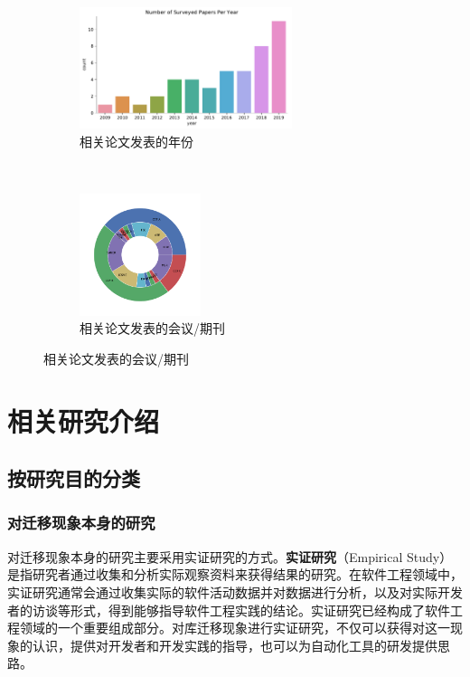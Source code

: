 \documentclass[UTF8]{ctexart}
\begin{document}
\begin{figure}[t!]
\centering
	\begin{subfigure}[t]{0.55\textwidth}
        \centering
        \includegraphics[height=1.4in]{fig/paper_year.pdf}
        \caption{相关论文发表的年份}
        \label{fig:paper-year} 
    \end{subfigure}
    ~
    \begin{subfigure}[t]{0.4\textwidth}
        \centering
        \includegraphics[height=1.4in]{fig/paper_conf_rank.pdf}
        \caption{相关论文发表的会议/期刊}
        \label{fig:paper-conf} 
    \end{subfigure}
\end{figure}

\section{相关研究介绍}
\label{section:related-work}

\subsection{按研究目的分类}

\subsubsection{对迁移现象本身的研究}


对迁移现象本身的研究主要采用实证研究的方式。\textbf{实证研究}（Empirical Study）是指研究者通过收集和分析实际观察资料来获得结果的研究。在软件工程领域中，实证研究通常会通过收集实际的软件活动数据并对数据进行分析，以及对实际开发者的访谈等形式，得到能够指导软件工程实践的结论。实证研究已经构成了软件工程领域的一个重要组成部分\cite{2002TSE-Kitchenham-Preliminary, 2007ICSE-Sjoberg-Future}。对库迁移现象进行实证研究，不仅可以获得对这一现象的认识，提供对开发者和开发实践的指导，也可以为自动化工具的研发提供思路。
\end{document}
